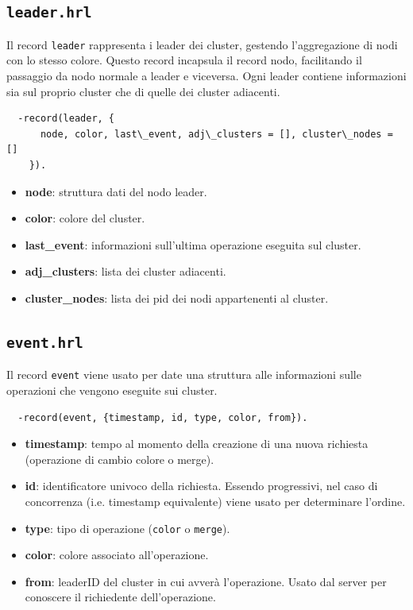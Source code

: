 \documentclass[12pt, a4paper]{report}
\begin{document}
\subsection{\texttt{leader.hrl}}

Il record \texttt{leader} rappresenta i leader dei cluster, gestendo l’aggregazione di nodi con lo stesso colore. Questo record incapsula il record nodo, facilitando il passaggio da nodo normale a leader e viceversa. Ogni leader contiene informazioni sia sul proprio cluster che di quelle dei cluster adiacenti.

\begin{tcolorbox}[title=Definizione del record \texttt{leader}]
\begin{verbatim}
  -record(leader, {
      node, color, last\_event, adj\_clusters = [], cluster\_nodes = []
    }).
\end{verbatim}
\end{tcolorbox}

\begin{itemize}
    \item \textbf{node}: struttura dati del nodo leader.
    \item \textbf{color}: colore del cluster.
    \item \textbf{last\_event}: informazioni sull'ultima operazione eseguita sul cluster.
    \item \textbf{adj\_clusters}: lista dei cluster adiacenti.
    \item \textbf{cluster\_nodes}: lista dei pid dei nodi appartenenti al cluster.
\end{itemize}

\subsection{\texttt{event.hrl}}

Il record \texttt{event} viene usato per date una struttura alle informazioni sulle operazioni che vengono eseguite sui cluster.

\begin{tcolorbox}[title=Definizione del record \texttt{event}]
\begin{verbatim}
  -record(event, {timestamp, id, type, color, from}).
\end{verbatim}
\end{tcolorbox}

\begin{itemize}
    \item \textbf{timestamp}: tempo al momento della creazione di una nuova richiesta (operazione di cambio colore o merge).
    \item \textbf{id}: identificatore univoco della richiesta. Essendo progressivi, nel caso di concorrenza (i.e. timestamp equivalente) viene usato per determinare l'ordine.
    \item \textbf{type}: tipo di operazione (\texttt{color} o \texttt{merge}).
    \item \textbf{color}: colore associato all'operazione.
    \item \textbf{from}: leaderID del cluster in cui avver\`a l'operazione. Usato dal server per conoscere il richiedente dell'operazione.
\end{itemize}
\end{document}
